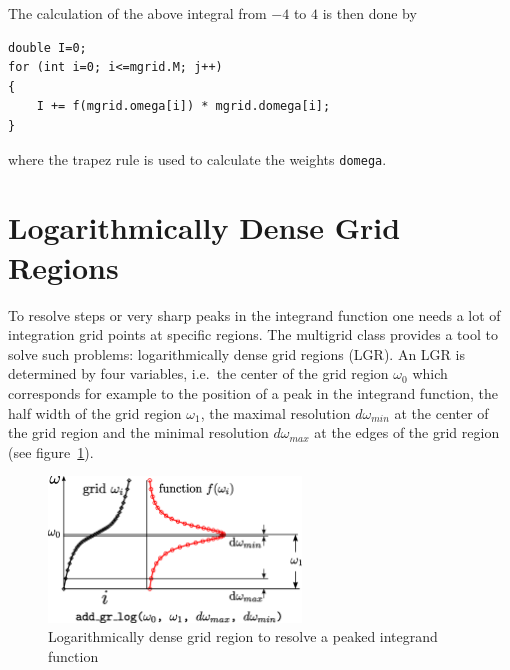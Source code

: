 The calculation of the above integral from $-4$ to $4$ is then done by

\begin{lstlisting}
double I=0;
for (int i=0; i<=mgrid.M; j++)
{
	I += f(mgrid.omega[i]) * mgrid.domega[i];
}
\end{lstlisting}
where the trapez rule is used to calculate the weights \texttt{domega}.

\section{Logarithmically Dense Grid Regions}
To resolve steps or very sharp peaks in the integrand function one needs a lot of integration grid points at specific regions. The multigrid class provides a tool to solve such problems: logarithmically dense grid regions (LGR). An LGR is determined by four variables, i.e.~the center of the grid region $\omega_0$ which corresponds for example to the position of a peak in the integrand function, the half width of the grid region $\omega_1$, the maximal resolution $d\omega_{min}$ at the center of the grid region and the minimal resolution $d\omega_{max}$ at the edges of the grid region (see figure~\ref{fig:lgr}). 
\begin{figure}[h]
	\centering
	\includegraphics[width=0.6\textwidth]{pics/loggridregion.eps}
	\caption{Logarithmically dense grid region to resolve a peaked integrand function}
	\label{fig:lgr}
\end{figure}

